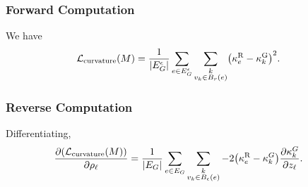 


\subsubsection{Forward Computation}
We have \begin{align*}
	\mathcal{L}_{\mathrm{curvature}}\pof{M} &= \frac{1}{\abs{E_G^\epsilon}}\sum_{e \in E_G^\epsilon} \sum_{\substack{k \\ v_k \in B_r\pof{e}}} \pof{\kappa_e^{\text{R}} - \kappa^{\text{G}}_k}^2.
\end{align*}

\subsubsection{Reverse Computation}
Differentiating, \begin{align*}
	\frac{\partial\pof{\mathcal{L}_{\mathrm{curvature}}\pof{M}}}{\partial\rho_\ell} &= \frac{1}{\abs{E_G}}\sum_{e \in E_G} \sum_{\substack{k \\ v_k \in B_\epsilon\pof{e}}} -2\pof{\kappa_e^{\text{R}} - \kappa^G_k}\frac{\partial\kappa^G_k}{\partial z_\ell}.
\end{align*}
